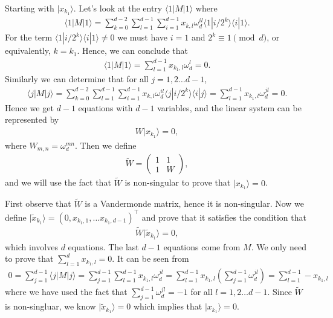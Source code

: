 \documentclass[11pt,letterpaper]{article}
\newcommand{\ket}[1]{|#1\rangle}
\newcommand{\bra}[1]{\langle#1|}
\newcommand{\braket}[2]{\langle#1|#2\rangle}
\newcommand{\1}{\mathbb{1}}
\theoremstyle{definition}
\begin{document}
Starting with $\ket{x_{k_1}}$.
Let's look at the entry $\bra{1}M\ket{1}$ where 
\begin{align}
	\bra{1}M\ket{1} = \sum_{k=0}^{d-2}\sum_{l = 1}^{d-1}\sum_{i=1}^{d-1} x_{k, l}\omega_d^{il}\braket{1}{i/2^k}\braket{i}{1}.
\end{align}
For the term $\braket{1}{i/2^k}\braket{i}{1} \neq 0$ we must have $i = 1$ and $2^k \equiv 1 \pmod{d}$, or equivalently,
$k = k_1$. Hence, we can conclude that 
\begin{align}
	\bra{1}M\ket{1} = \sum_{l = 1}^{d-1} x_{k_1,l}\omega_d^l = 0. 
\end{align}
Similarly we can determine that for all $j = 1,2\dots d-1$,
\begin{align}
	\bra{j}M\ket{j} 
	=  \sum_{k=0}^{d-2}\sum_{l = 1}^{d-1}\sum_{i=1}^{d-1} x_{k, l}\omega_d^{il}\braket{j}{i/2^k}\braket{i}{j} 
	= \sum_{l = 1}^{d-1}x_{k_1,l}\omega_d^{jl} = 0.
\end{align}
Hence we get $d-1$ equations with $d-1$ variables, and the linear system
can be represented by 
\begin{align}
	W \ket{x_{k_1}} = 0,
\end{align}
where $W_{m,n} = \omega_d^{mn}$. Then we define
\begin{align}
	\tilde{W} = 
	\begin{pmatrix}
	1 & 1 \\
	1 & W
	\end{pmatrix},
\end{align}
and we will use the fact that $\tilde{W}$ is non-singular to prove that $\ket{x_{k_1}} = 0$.

First observe that $\tilde{W}$ is a Vandermonde matrix, hence it is non-singular.
Now we define $\ket{\tilde{x}_{k_1}} = (0, x_{k_1,1}, \dots x_{k_1,d-1})^\intercal$ 
and prove that it satisfies the condition
that 
\begin{align}
	\tilde{W} \ket{\tilde{x}_{k_1}} = 0,
\end{align}
which involves $d$ equations. The last $d-1$ equations come from $M$.
We only need to prove that $\sum_{l=1}^d x_{k_1, l} = 0$.
It can be seen from
\begin{align}
	0=\sum_{j = 1}^{d-1} \bra{j}M\ket{j}  
	=  \sum_{j=1}^{d-1}\sum_{l = 1}^{d-1}x_{k_1,l}\omega_d^{jl}
	=\sum_{l = 1}^{d-1}x_{k_1,l} (\sum_{j=1}^{d-1} \omega_d^{jl})
	= \sum_{l = 1}^{d-1}- x_{k_1,l}
\end{align}
where we have used the fact that $\sum_{j=1}^{d-1} \omega_d^{jl} =-1$ for all $l = 1,2\dots d-1$.
Since $\tilde{W}$ is non-singluar, we know $\ket{\tilde{x}_{k_1}} = 0$ which implies that $\ket{x_{k_1}} = 0$.
\end{document}

